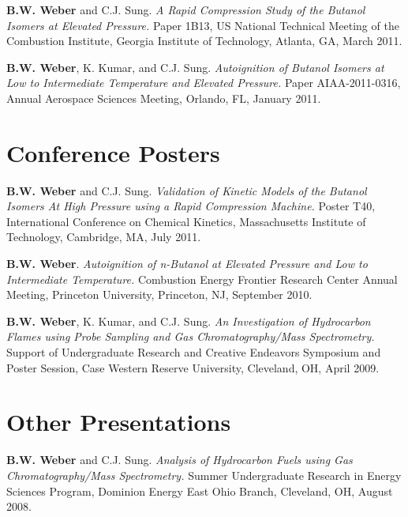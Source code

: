 \begin{bibsection}
\item[] \textbf{B.W. Weber} and C.J. Sung. \textit{A Rapid Compression
        Study of the Butanol Isomers at Elevated Pressure.} Paper 1B13,
          US National Technical Meeting of the Combustion
        Institute, Georgia Institute of Technology, Atlanta, GA, March
        2011.

\item[] \textbf{B.W. Weber}, K. Kumar, and C.J. Sung.
        \textit{Autoignition of Butanol Isomers at Low to Intermediate
        Temperature and Elevated Pressure.} Paper AIAA-2011-0316,
          Annual Aerospace Sciences Meeting,
        Orlando, FL, January 2011.
\end{bibsection}

\section{Conference Posters}

\begin{bibsection}
\item[] \textbf{B.W. Weber} and C.J. Sung. \textit{Validation of
        Kinetic Models of the Butanol Isomers At High Pressure
        using a Rapid Compression Machine.} Poster T40,
         International Conference on Chemical Kinetics,
         Massachusetts Institute of Technology, Cambridge, MA,
         July 2011.

\item[] \textbf{B.W. Weber}. \textit{Autoignition of n-Butanol at
        Elevated Pressure and Low to Intermediate Temperature.}
         Combustion Energy Frontier Research Center
        Annual Meeting, Princeton University, Princeton, NJ,
        September 2010.

\item[] \textbf{B.W. Weber}, K. Kumar, and C.J. Sung. \textit{An
        Investigation of Hydrocarbon Flames using Probe Sampling and
        Gas Chromatography/Mass Spectrometry.} Support of Undergraduate
        Research and Creative Endeavors Symposium and Poster Session,
        Case Western Reserve University, Cleveland, OH, April 2009.
\end{bibsection}

\section{Other Presentations}

\begin{bibsection}
\item[] \textbf{ B.W. Weber} and C.J. Sung. \textit{Analysis of
        Hydrocarbon Fuels using Gas Chromatography/Mass Spectrometry.}
        Summer Undergraduate Research in Energy Sciences Program,
        Dominion Energy East Ohio Branch, Cleveland, OH, August 2008.
\end{bibsection}

